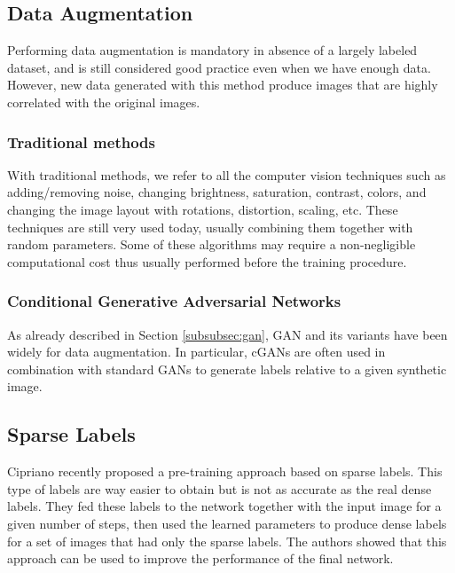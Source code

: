 \subsection{Data Augmentation}
Performing data augmentation is mandatory in absence of a largely labeled
dataset, and is still considered good practice even when we have enough data.
However, new data generated with this method produce images that are highly
correlated with the original images.

\subsubsection{Traditional methods}
With traditional methods, we refer to all the computer vision techniques such as
adding/removing noise, changing brightness, saturation, contrast, colors, and
changing the image layout with rotations, distortion, scaling, etc. These
techniques are still very used today, usually combining them together with
random parameters. Some of these algorithms may require a non-negligible
computational cost thus usually performed before the training procedure.

\subsubsection{Conditional Generative Adversarial Networks}
As already described in Section \ref{subsubsec:gan}, GAN and its variants have
been widely for data augmentation. In particular, cGANs are often used in
combination with standard GANs to generate labels relative to a given synthetic
image.

\subsection{Sparse Labels}
Cipriano \etal \cite{cipriano2022improving} recently proposed a pre-training
approach based on sparse labels. This type of labels are way easier to obtain
but is not as accurate as the real dense labels. They fed these labels to the
network together with the input image for a given number of steps, then used the
learned parameters to produce dense labels for a set of images that had only the
sparse labels. The authors showed that this approach can be used to improve the
performance of the final network.

